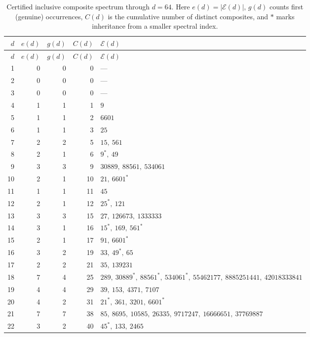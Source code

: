 \documentclass[11pt]{article}
\newcommand{\Eset}{\mathcal E}
\begin{document}
\begin{longtable}{r r r r >{\raggedright\arraybackslash}p{}}
\caption{Certified inclusive composite spectrum through $d=64$.  Here
$e(d)=|\Eset(d)|$, $g(d)$ counts first (genuine) occurrences, $C(d)$ is the
cumulative number of distinct composites, and $\ast$ marks inheritance from a
smaller spectral index.}\label{tab:exceptions}\\
\toprule
$d$ & $e(d)$ & $g(d)$ & $C(d)$ & $\Eset(d)$\\
\midrule
\endfirsthead
\toprule
$d$ & $e(d)$ & $g(d)$ & $C(d)$ & $\Eset(d)$\\
\midrule
\endhead
1&0&0&0&---\\
2&0&0&0&---\\
3&0&0&0&---\\
4&1&1&1&$9$\\
5&1&1&2&$6601$\\
6&1&1&3&$25$\\
7&2&2&5&$15,\allowbreak\ 561$\\
8&2&1&6&$9^{\ast},\allowbreak\ 49$\\
9&3&3&9&$30889,\allowbreak\ 88561,\allowbreak\ 534061$\\
10&2&1&10&$21,\allowbreak\ 6601^{\ast}$\\
11&1&1&11&$45$\\
12&2&1&12&$25^{\ast},\allowbreak\ 121$\\
13&3&3&15&$27,\allowbreak\ 126673,\allowbreak\ 1333333$\\
14&3&1&16&$15^{\ast},\allowbreak\ 169,\allowbreak\ 561^{\ast}$\\
15&2&1&17&$91,\allowbreak\ 6601^{\ast}$\\
16&3&2&19&$33,\allowbreak\ 49^{\ast},\allowbreak\ 65$\\
17&2&2&21&$35,\allowbreak\ 139231$\\
18&7&4&25&$289,\allowbreak\ 30889^{\ast},\allowbreak\ 88561^{\ast},\allowbreak\ 534061^{\ast},\allowbreak\ 55462177,\allowbreak\ 8885251441,\allowbreak\ 42018333841$\\
19&4&4&29&$39,\allowbreak\ 153,\allowbreak\ 4371,\allowbreak\ 7107$\\
20&4&2&31&$21^{\ast},\allowbreak\ 361,\allowbreak\ 3201,\allowbreak\ 6601^{\ast}$\\
21&7&7&38&$85,\allowbreak\ 8695,\allowbreak\ 10585,\allowbreak\ 26335,\allowbreak\ 9717247,\allowbreak\ 16666651,\allowbreak\ 37769887$\\
22&3&2&40&$45^{\ast},\allowbreak\ 133,\allowbreak\ 2465$\\

\end{longtable}
\end{document}
